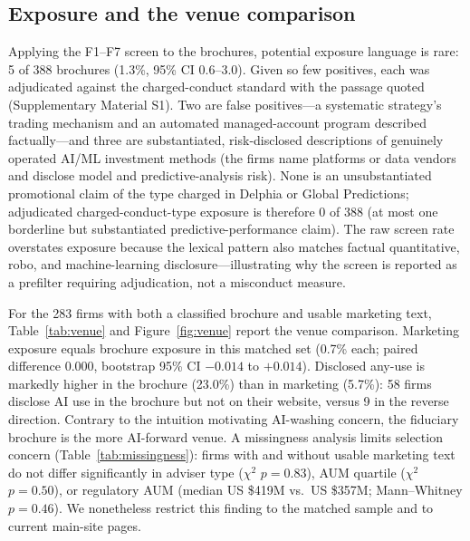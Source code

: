 \documentclass[utf8]{FrontiersinHarvard}
\begin{document}
\subsection{Exposure and the venue comparison}
Applying the F1--F7 screen to the brochures, potential exposure language is rare: 5 of 388 brochures (1.3\%, 95\% CI 0.6--3.0). Given so few positives, each was adjudicated against the charged-conduct standard with the passage quoted (Supplementary Material S1). Two are false positives---a systematic strategy's trading mechanism and an automated managed-account program described factually---and three are substantiated, risk-disclosed descriptions of genuinely operated AI/ML investment methods (the firms name platforms or data vendors and disclose model and predictive-analysis risk). None is an unsubstantiated promotional claim of the type charged in Delphia or Global Predictions; adjudicated charged-conduct-type exposure is therefore 0 of 388 (at most one borderline but substantiated predictive-performance claim). The raw screen rate overstates exposure because the lexical pattern also matches factual quantitative, robo, and machine-learning disclosure---illustrating why the screen is reported as a prefilter requiring adjudication, not a misconduct measure.

For the 283 firms with both a classified brochure and usable marketing text, Table~\ref{tab:venue} and Figure~\ref{fig:venue} report the venue comparison. Marketing exposure equals brochure exposure in this matched set (0.7\% each; paired difference 0.000, bootstrap 95\% CI $-0.014$ to $+0.014$). Disclosed any-use is markedly higher in the brochure (23.0\%) than in marketing (5.7\%): 58 firms disclose AI use in the brochure but not on their website, versus 9 in the reverse direction. Contrary to the intuition motivating AI-washing concern, the fiduciary brochure is the more AI-forward venue. A missingness analysis limits selection concern (Table~\ref{tab:missingness}): firms with and without usable marketing text do not differ significantly in adviser type ($\chi^2$ $p = 0.83$), AUM quartile ($\chi^2$ $p = 0.50$), or regulatory AUM (median US \$419M vs.\ US \$357M; Mann--Whitney $p = 0.46$). We nonetheless restrict this finding to the matched sample and to current main-site pages.
\end{document}
